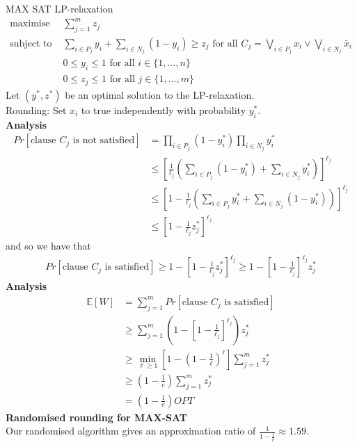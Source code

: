 \documentclass[onecolumn]{report}
\begin{document}
MAX SAT LP-relaxation
\begin{align*}
    \text{maximise } & \sum_{j=1}^m z_j\\
    \text{subject to } & \sum_{i \in P_j}y_i+\sum_{i \in N_j}(1-y_i) \geq z_j \text{ for all } C_j=\bigvee_{i \in P_j}x_i \vee \bigvee_{i \in N_j}\bar{x}_i\\
    & 0 \leq y_i \leq 1 \text{ for all } i \in \{1, \ldots, n\}\\
    & 0 \leq z_j \leq 1 \text{ for all } j \in \{1, \ldots, m\}
\end{align*}
Let $(y^*, z^*)$ be an optimal solution to the LP-relaxation.\\
Rounding: Set $x_i$ to true independently with probability $y_i^*$.\\
\textbf{Analysis}\\
\begin{align*}
    Pr[\text{clause } C_j \text{ is not satisfied}] &= \prod_{i \in P_j}(1-y_i^*) \prod_{i \in N_j}y_i^*\\
    &\leq \left[\frac{1}{\ell_j}\left(\sum_{i \in P_j}\left(1-y_i^*\right)+\sum_{i \in N_j} y_i^*\right)\right]^{\ell_j}\\
    &\leq \left[1-\frac{1}{\ell_j}\left(\sum_{i \in P_j} y_i^*+\sum_{i \in N_j}\left(1-y_i^*\right)\right)\right]^{\ell_j}\\
    &\leq \left[1-\frac{1}{\ell_j}z_j^*\right]^{\ell_j}
\end{align*}
and so we have that
\begin{align*}
    Pr[\text{clause } C_j \text{ is satisfied}] \geq 1-\left[1-\frac{1}{\ell_j}z_j^*\right]^{\ell_j} \geq 1-\left[1-\frac{1}{\ell_j}\right]^{\ell_j}z_j^*
\end{align*}
\textbf{Analysis}\\
\begin{align*}
    \mathbb{E}[W] &= \sum_{j=1}^mPr[\text{clause } C_j \text{ is satisfied}]\\
    &\geq \sum_{j=1}^m\left(1-\left[1-\frac{1}{\ell_j}\right]^{\ell_j}\right)z_j^*\\
    &\geq \min_{\ell \geq 1}\left[ 1-\left(1-\frac{1}{\ell}\right)^\ell\right]\sum_{j=1}^mz_j^*\\
    &\geq \left(1-\frac{1}{e}\right)\sum_{j=1}^mz_j^*\\
    &= \left(1-\frac{1}{e}\right)OPT
\end{align*}
\textbf{Randomised rounding for MAX-SAT}\\
Our randomised algorithm gives an approximation ratio of $\frac{1}{1-\frac{1}{e}} \approx 1.59$.\\
\end{document}
